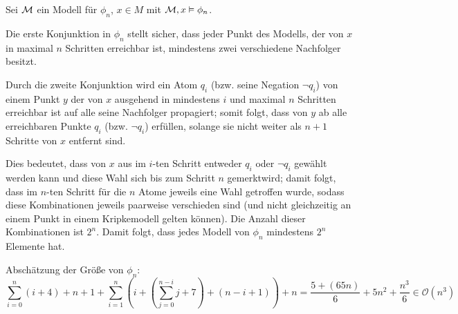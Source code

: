 
Sei $\mathcal{M}$ ein Modell für $\phi_n$, $x\in M$ mit $\mathcal{M}, x \vDash
\phi_n$. 

Die erste Konjunktion in $\phi_n$ stellt sicher, dass jeder Punkt des
Modells, der von $x$ in maximal $n$ Schritten erreichbar ist, mindestens zwei
verschiedene Nachfolger besitzt.

Durch die zweite Konjunktion wird ein Atom $q_i$ (bzw. seine Negation $\neg q_i$)
von einem Punkt $y$ der von $x$ ausgehend in mindestens $i$ und maximal $n$
Schritten erreichbar ist auf alle seine Nachfolger propagiert; somit folgt,
dass von $y$ ab alle erreichbaren Punkte $q_i$ (bzw. $\neg q_i$) erfüllen,
solange sie nicht weiter als $n+1$ Schritte von $x$ entfernt sind.

Dies bedeutet, dass von $x$ aus im $i$-ten Schritt entweder $q_i$ oder $\neg
q_i$ gewählt werden kann und diese Wahl sich bis zum Schritt $n$ \glqq
gemerkt\grqq wird; damit folgt, dass im $n$-ten Schritt für die $n$ Atome
jeweils eine Wahl getroffen wurde, sodass diese Kombinationen jeweils paarweise
verschieden sind (und nicht gleichzeitig an einem Punkt in einem Kripkemodell
gelten können). Die Anzahl dieser Kombinationen ist $2^n$. Damit folgt, dass
jedes Modell von $\phi_n$ mindestens $2^n$ Elemente hat.

Abschätzung der Größe von $\phi_n$:
\[
\sum_{i=0}^{n}(i + 4) + n + 1 + \sum_{i=1}^{n}\left(i + \left(\sum_{j=0}^{n-i}
j + 7\right) + (n - i + 1) \right) + n = \frac{5+(65 n)}{6}+5 n^2+\frac{n^3}{6}
\in \mathcal{O}(n^3)
\]

